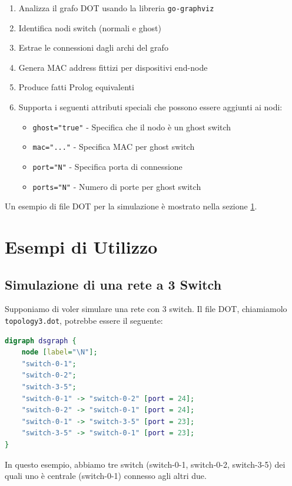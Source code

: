 \documentclass[12pt,a4paper]{article}
\begin{document}
\begin{enumerate}
    \item Analizza il grafo DOT usando la libreria \texttt{go-graphviz}
    \item Identifica nodi switch (normali e ghost)
    \item Estrae le connessioni dagli archi del grafo
    \item Genera MAC address fittizi per dispositivi end-node
    \item Produce fatti Prolog equivalenti
    \item Supporta i seguenti attributi speciali che possono essere aggiunti ai nodi:
    \begin{itemize}
        \item \texttt{ghost="true"} - Specifica che il nodo è un ghost switch
        \item \texttt{mac="..."} - Specifica MAC per ghost switch
        \item \texttt{port="N"} - Specifica porta di connessione
        \item \texttt{ports="N"} - Numero di porte per ghost switch
    \end{itemize}
\end{enumerate}

Un esempio di file DOT per la simulazione è mostrato nella sezione \ref{sec:examples}.

\section{Esempi di Utilizzo}
\label{sec:examples}

\subsection{Simulazione di una rete a 3 Switch}

Supponiamo di voler simulare una rete con 3 switch. Il file DOT, chiamiamolo \texttt{topology3.dot}, potrebbe essere il seguente: \\
\begin{lstlisting}[language=DOT]
    digraph dsgraph {
	node [label="\N"];
	"switch-0-1";
	"switch-0-2";
	"switch-3-5";
	"switch-0-1" -> "switch-0-2" [port = 24]; 
	"switch-0-2" -> "switch-0-1" [port = 24];
	"switch-0-1" -> "switch-3-5" [port = 23];
	"switch-3-5" -> "switch-0-1" [port = 23];
}
\end{lstlisting}

In questo esempio, abbiamo tre switch (switch-0-1, switch-0-2, switch-3-5) dei quali uno è centrale (switch-0-1) connesso agli 
altri due. \\
\end{document}

